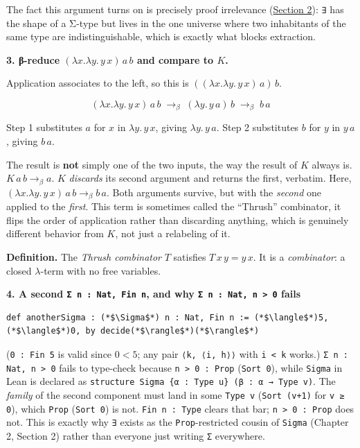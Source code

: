 The fact this argument turns on is precisely proof irrelevance (\hyperref[sec:02-terminology-and-coc:02-pi-sigma-and-coc:1]{Section 2}): \texttt{∃} has the shape of a Σ-type but lives in the one universe where two inhabitants of the same type are indistinguishable, which is exactly what blocks extraction.

\textbf{3. β-reduce \((\lambda x.\lambda y.\, y\, x)\, a\, b\) and compare to \(K\).}

Application associates to the left, so this is \(((\lambda x.\lambda y.\, y\, x)\, a)\, b\).

\[
(\lambda x.\lambda y.\, y\, x)\, a\, b
\;\longrightarrow_\beta\; (\lambda y.\, y\, a)\, b
\;\longrightarrow_\beta\; b\, a
\]

Step 1 substitutes \(a\) for \(x\) in \(\lambda y.\, y\, x\), giving \(\lambda y.\, y\, a\). Step 2 substitutes \(b\) for \(y\) in \(y\, a\), giving \(b\, a\).

The result is \textbf{not} simply one of the two inputs, the way the result of \(K\) always is. \(K\,a\,b \to_\beta a\). \(K\) \emph{discards} its second argument and returns the first, verbatim. Here, \((\lambda x.\lambda y.\, y\, x)\, a\, b
\to_\beta b\, a\). Both arguments survive, but with the \emph{second} one applied to the \emph{first}. This term is sometimes called the ``Thrush'' combinator, it flips the order of application rather than discarding anything, which is genuinely different behavior from \(K\), not just a relabeling of it.

\textbf{Definition.} The \emph{Thrush combinator} \(T\) satisfies \(T\,x\,y = y\,x\). It is a \emph{combinator}: a closed \(\lambda\)-term with no free variables.

\textbf{4. A second \texttt{Σ n : Nat, Fin n}, and why \texttt{Σ n : Nat, n > 0} fails}

\begin{lstlisting}
def anotherSigma : (*$\Sigma$*) n : Nat, Fin n := (*$\langle$*)5, (*$\langle$*)0, by decide(*$\rangle$*)(*$\rangle$*)
\end{lstlisting}

(\texttt{0 : Fin 5} is valid since \(0 < 5\); any pair \texttt{⟨k, ⟨i, h⟩⟩} with \texttt{i < k} works.) \texttt{Σ n : Nat, n > 0} fails to type-check because \texttt{n > 0 : Prop} (\texttt{Sort 0}), while \texttt{Sigma} in Lean is declared as \texttt{structure Sigma \{α : Type u\} (β : α → Type v)}. The \emph{family} of the second component must land in some \texttt{Type v} (\texttt{Sort (v+1)} for \texttt{v ≥ 0}), which \texttt{Prop} (\texttt{Sort 0}) is not. \texttt{Fin n : Type} clears that bar; \texttt{n > 0 : Prop} does not. This is exactly why \texttt{∃} exists as the \texttt{Prop}-restricted cousin of \texttt{Sigma} (Chapter 2, Section 2) rather than everyone just writing \texttt{Σ} everywhere.

